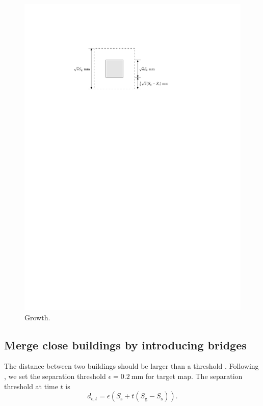 \documentclass[graybox]{svmult}
\begin{document}
\begin{figure}[tb]
	\centering
	\includegraphics{Growth}
	\caption{Growth.}
	\label{fig:Growth}
\end{figure}


\subsection{Merge close buildings by introducing bridges}
The distance between two buildings should be larger than a threshold
\parencite{Regnauld2001,Li2004}.
Following \textcite{Basaraner2008,Stoter2009}, 
we set the separation threshold $\epsilon= 0.2~\text{mm}$ for target map. 
The separation threshold at time $t$ is
\begin{equation}
\label{eq:d_epsilont}
d_{\epsilon, t} = \epsilon (S_\mathrm{s}+t(S_\mathrm{g}-S_\mathrm{s})).
\end{equation}
\end{document}
